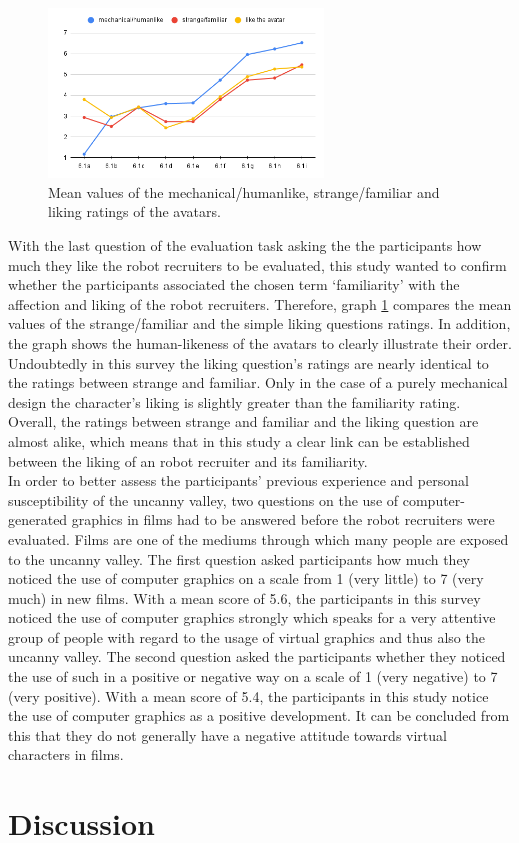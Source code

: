 \begin{figure} %
    \centering
    \includegraphics[width=0.65\textwidth]{graphics/result/result4.png}
    \caption{Mean values of the mechanical/humanlike, strange/familiar and liking ratings of the avatars.}
    \label{fig:likeability}
\end{figure}
With the last question of the evaluation task asking the the participants how much they like the robot recruiters to be evaluated, this study wanted to confirm whether the participants associated the chosen term `familiarity' with the affection and liking of the robot recruiters. Therefore, graph \ref{fig:likeability} compares the mean values of the strange/familiar and the simple liking questions ratings. In addition, the graph shows the human-likeness of the avatars to clearly illustrate their order. Undoubtedly in this survey the liking question's ratings are nearly identical to the ratings between strange and familiar. Only in the case of a purely mechanical design the character's liking is slightly greater than the familiarity rating. Overall, the ratings between strange and familiar and the liking question are almost alike, which means that in this study a clear link can be established between the liking of an robot recruiter and its familiarity.\\
In order to better assess the participants' previous experience and personal susceptibility of the uncanny valley, two questions on the use of computer-generated graphics in films had to be answered before the robot recruiters were evaluated. Films are one of the mediums through which many people are exposed to the uncanny valley. The first question asked participants how much they noticed the use of computer graphics on a scale from 1 (very little) to 7 (very much) in new films. With a mean score of 5.6, the participants in this survey noticed the use of computer graphics strongly which speaks for a very attentive group of people with regard to the usage of virtual graphics and thus also the uncanny valley. The second question asked the participants whether they noticed the use of such in a positive or negative way on a scale of 1 (very negative) to 7 (very positive). With a mean score of 5.4, the participants in this study notice the use of computer graphics as a positive development. It can be concluded from this that they do not generally have a negative attitude towards virtual characters in films.


\section{Discussion}

